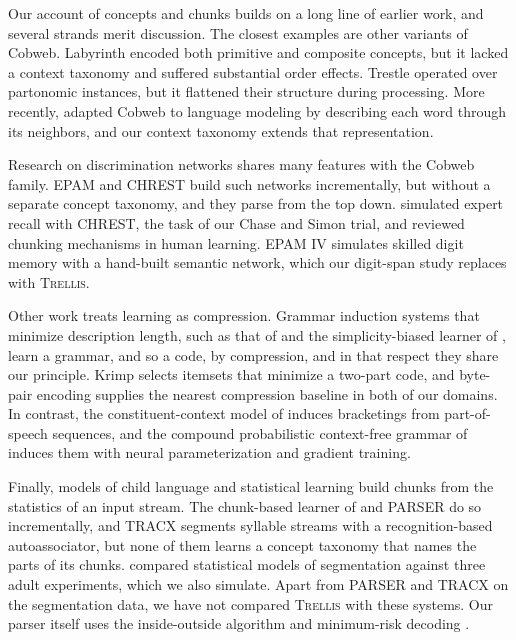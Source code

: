 \documentclass[11pt,letterpaper]{article}
\newcommand{\trellis}{\textsc{Trellis}}
\begin{document}
Our account of concepts and chunks builds on a long line of earlier work, and several
strands merit discussion. The closest examples are other variants of Cobweb.
Labyrinth \citep{labyrinth-thompson-langley} encoded both primitive and composite
concepts, but it lacked a context taxonomy and suffered substantial order effects.
Trestle \citep{trestle-maclellan} operated over partonomic instances, but it flattened
their structure during processing. More recently, \citet{maclellan-cobweb-language}
adapted Cobweb to language modeling by describing each word through its neighbors, and
our context taxonomy extends that representation.

Research on discrimination networks shares many features with the Cobweb family. EPAM
\citep{feigenbaum-epam} and CHREST \citep{gobet-lane-chrest} build such networks
incrementally, but without a separate concept taxonomy, and they parse from the top
down. \citet{gobet-simon-five-seconds} simulated expert recall with CHREST, the task of
our Chase and Simon trial, and \citet{gobet-chunking-tics} reviewed chunking mechanisms
in human learning. EPAM IV \citep{richman-epam4} simulates skilled digit memory with a
hand-built semantic network, which our digit-span study replaces with \trellis{}.

Other work treats learning as compression. Grammar induction systems that minimize
description length, such as that of \citet{wolff-grammar} and the simplicity-biased
learner of \citet{grids-langley-stromsten}, learn a grammar, and so a code, by
compression, and in that respect they share our principle. Krimp \citep{vreeken-krimp}
selects itemsets that minimize a two-part code, and byte-pair encoding
\citep{sennrich-bpe} supplies the nearest compression baseline in both of our domains.
In contrast, the constituent-context model of \citet{klein-manning-ccm} induces
bracketings from part-of-speech sequences, and the compound probabilistic context-free
grammar of \citet{kim-compound-pcfg} induces them with neural parameterization and
gradient training.

Finally, models of child language and statistical learning build chunks from the
statistics of an input stream. The chunk-based learner of \citet{mccauley-cbl} and
PARSER \citep{perruchet-parser} do so incrementally, and TRACX \citep{french-tracx}
segments syllable streams with a recognition-based autoassociator, but none of them
learns a concept taxonomy that names the parts of its chunks. \citet{frank-segmentation}
compared statistical models of segmentation against three adult experiments, which we
also simulate. Apart from PARSER and TRACX on the segmentation data, we have not
compared \trellis{} with these systems. Our parser itself uses the inside-outside
algorithm \citep{lari-young} and minimum-risk decoding \citep{goodman-metrics}.
\end{document}
